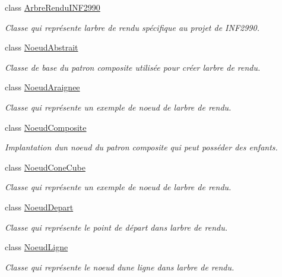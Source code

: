 \begin{DoxyCompactItemize}
class \hyperlink{class_arbre_rendu_i_n_f2990}{Arbre\+Rendu\+I\+N\+F2990}
\begin{DoxyCompactList}\small\item\em Classe qui représente l\textquotesingle{}arbre de rendu spécifique au projet de I\+N\+F2990. \end{DoxyCompactList}\item 
class \hyperlink{class_noeud_abstrait}{Noeud\+Abstrait}
\begin{DoxyCompactList}\small\item\em Classe de base du patron composite utilisée pour créer l\textquotesingle{}arbre de rendu. \end{DoxyCompactList}\item 
class \hyperlink{class_noeud_araignee}{Noeud\+Araignee}
\begin{DoxyCompactList}\small\item\em Classe qui représente un exemple de noeud de l\textquotesingle{}arbre de rendu. \end{DoxyCompactList}\item 
class \hyperlink{class_noeud_composite}{Noeud\+Composite}
\begin{DoxyCompactList}\small\item\em Implantation d\textquotesingle{}un noeud du patron composite qui peut posséder des enfants. \end{DoxyCompactList}\item 
class \hyperlink{class_noeud_cone_cube}{Noeud\+Cone\+Cube}
\begin{DoxyCompactList}\small\item\em Classe qui représente un exemple de noeud de l\textquotesingle{}arbre de rendu. \end{DoxyCompactList}\item 
class \hyperlink{class_noeud_depart}{Noeud\+Depart}
\begin{DoxyCompactList}\small\item\em Classe qui représente le point de départ dans l\textquotesingle{}arbre de rendu. \end{DoxyCompactList}\item 
class \hyperlink{class_noeud_ligne}{Noeud\+Ligne}
\begin{DoxyCompactList}\small\item\em Classe qui représente le noeud d\textquotesingle{}une ligne dans l\textquotesingle{}arbre de rendu. \end{DoxyCompactList}\item 

\end{DoxyCompactItemize}
